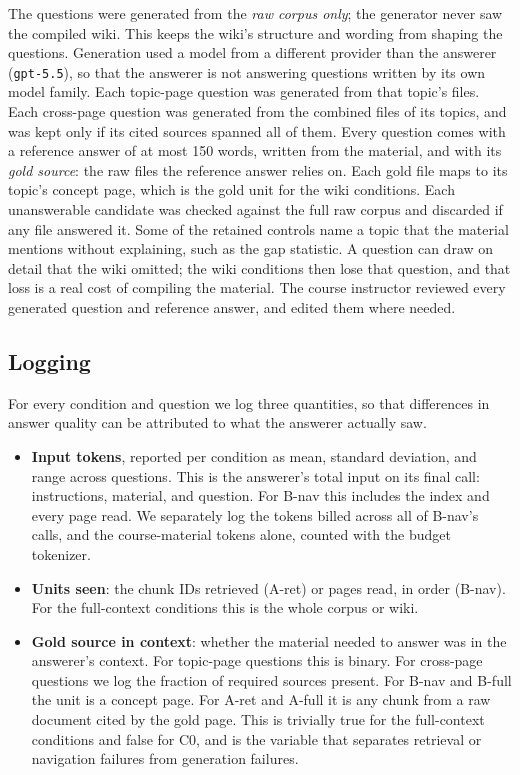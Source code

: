 \documentclass[letterpaper]{article} %
\begin{document}
The questions were generated from the \emph{raw corpus only}; the generator never saw the compiled wiki. This keeps the wiki's structure and wording from shaping the questions. Generation used a model from a different provider than the answerer (\texttt{gpt-5.5}), so that the answerer is not answering questions written by its own model family. Each topic-page question was generated from that topic's files. Each cross-page question was generated from the combined files of its topics, and was kept only if its cited sources spanned all of them. Every question comes with a reference answer of at most 150 words, written from the material, and with its \emph{gold source}: the raw files the reference answer relies on. Each gold file maps to its topic's concept page, which is the gold unit for the wiki conditions. Each unanswerable candidate was checked against the full raw corpus and discarded if any file answered it. Some of the retained controls name a topic that the material mentions without explaining, such as the gap statistic. A question can draw on detail that the wiki omitted; the wiki conditions then lose that question, and that loss is a real cost of compiling the material. The course instructor reviewed every generated question and reference answer, and edited them where needed.

\subsection{Logging}

For every condition and question we log three quantities, so that differences in answer quality can be attributed to what the answerer actually saw.
\begin{itemize}
\item \textbf{Input tokens}, reported per condition as mean, standard deviation, and range across questions. This is the answerer's total input on its final call: instructions, material, and question. For B-nav this includes the index and every page read. We separately log the tokens billed across all of B-nav's calls, and the course-material tokens alone, counted with the budget tokenizer.
\item \textbf{Units seen}: the chunk IDs retrieved (A-ret) or pages read, in order (B-nav). For the full-context conditions this is the whole corpus or wiki.
\item \textbf{Gold source in context}: whether the material needed to answer was in the answerer's context. For topic-page questions this is binary. For cross-page questions we log the fraction of required sources present. For B-nav and B-full the unit is a concept page. For A-ret and A-full it is any chunk from a raw document cited by the gold page. This is trivially true for the full-context conditions and false for C0, and is the variable that separates retrieval or navigation failures from generation failures.
\end{itemize}
\end{document}
